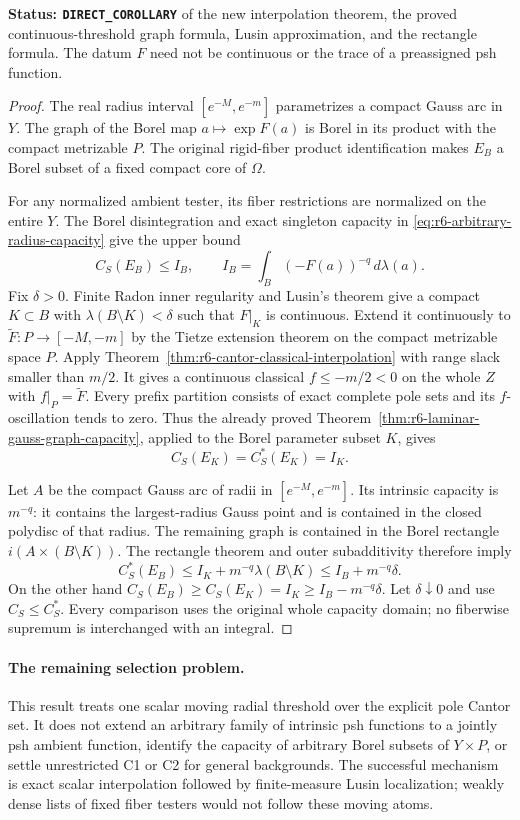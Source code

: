 \documentclass[11pt,a4paper]{article}
\numberwithin{equation}{section}
\theoremstyle{definition}
\theoremstyle{remark}
\begin{document}
\noindent\textbf{Status: \texttt{DIRECT\_COROLLARY}} of the
new interpolation theorem, the proved continuous-threshold graph
formula, Lusin approximation, and the rectangle formula. The datum
$F$ need not be continuous or the trace of a preassigned psh function.

\begin{proof}
The real radius interval $[e^{-M},e^{-m}]$ parametrizes a compact
Gauss arc in $Y$. The graph of the Borel map $a\mapsto\exp F(a)$
is Borel in its product with the compact metrizable $P$. The original
rigid-fiber product identification makes $E_B$ a Borel subset of a
fixed compact core of $\Omega$.

For any normalized ambient tester, its fiber restrictions are
normalized on the entire $Y$. The Borel disintegration and exact
singleton capacity in \eqref{eq:r6-arbitrary-radius-capacity} give
the upper bound
\[
                       C_S(E_B)\le I_B,
       \qquad I_B=\int_B(-F(a))^{-q}\,d\lambda(a).
\]
Fix $\delta>0$. Finite Radon inner regularity and Lusin's theorem
give a compact $K\subset B$ with
$\lambda(B\setminus K)<\delta$ such that $F|_K$ is continuous.
Extend it continuously to $\widetilde F:P\to[-M,-m]$ by the
Tietze extension theorem on the compact metrizable space $P$.
Apply Theorem~\ref{thm:r6-cantor-classical-interpolation} with
range slack smaller than $m/2$. It gives a continuous classical
$f\le-m/2<0$ on the whole $Z$ with $f|_P=\widetilde F$.
Every prefix partition consists of exact complete pole sets and its
$f$-oscillation tends to zero. Thus the already proved
Theorem~\ref{thm:r6-laminar-gauss-graph-capacity}, applied to the
Borel parameter subset $K$, gives
\[
              C_S(E_K)=C_S^*(E_K)=I_K.
\]

Let $A$ be the compact Gauss arc of radii in
$[e^{-M},e^{-m}]$. Its intrinsic capacity is $m^{-q}$: it contains
the largest-radius Gauss point and is contained in the closed
polydisc of that radius. The remaining graph is contained in the
Borel rectangle $i(A\times(B\setminus K))$. The rectangle theorem
and outer subadditivity therefore imply
\[
 C_S^*(E_B)\le I_K+m^{-q}\lambda(B\setminus K)
                          \le I_B+m^{-q}\delta.
\]
On the other hand $C_S(E_B)\ge C_S(E_K)=I_K\ge I_B-m^{-q}\delta$.
Let $\delta\downarrow0$ and use $C_S\le C_S^*$. Every comparison
uses the original whole capacity domain; no fiberwise supremum is
interchanged with an integral.
\end{proof}

\paragraph{The remaining selection problem.}
This result treats one scalar moving radial threshold over the explicit
pole Cantor set. It does not extend an arbitrary family of intrinsic
psh functions to a jointly psh ambient function, identify the capacity
of arbitrary Borel subsets of $Y\times P$, or settle unrestricted C1
or C2 for general backgrounds. The successful mechanism is exact
scalar interpolation followed by finite-measure Lusin localization;
weakly dense lists of fixed fiber testers would not follow these
moving atoms.
\end{document}
